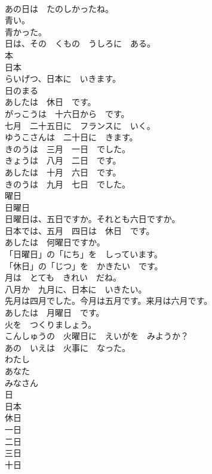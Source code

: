 \documentclass[8pt]{extreport}
\begin{document}
\begin{CJK}{UTF8}{min}
\\	あの日は　たのしかったね。	
\\	青い。	
\\	青かった。	
\\	日は、その　くもの　うしろに　ある。	
\\	本	
\\	日本	
\\	らいげつ、日本に　いきます。	
\\	日のまる	
\\	あしたは　休日　です。	
\\	がっこうは　十六日から　です。	
\\	七月　二十五日に　フランスに　いく。	
\\	ゆうこさんは　二十日に　きます。	
\\	きのうは　三月　一日　でした。	
\\	きょうは　八月　二日　です。	
\\	あしたは　十月　六日　です。	
\\	きのうは　九月　七日　でした。	
\\	曜日	
\\	日曜日	
\\	日曜日は、五日ですか。それとも六日ですか。	
\\	日本では、五月　四日は　休日　です。	
\\	あしたは　何曜日ですか。	
\\	「日曜日」の「にち」を　しっています。	
\\	「休日」の「じつ」を　かきたい　です。	
\\	月は　とても　きれい　だね。	
\\	八月か　九月に、日本に　いきたい。	
\\	先月は四月でした。今月は五月です。来月は六月です。	
\\	あしたは　月曜日　です。	
\\	火を　つくりましょう。	
\\	こんしゅうの　火曜日に　えいがを　みようか？	
\\	あの　いえは　火事に　なった。	
\\	わたし	
\\	あなた	
\\	みなさん	
\\	日	
\\	日本	
\\	休日	
\\	一日	
\\	二日	
\\	三日	
\\	十日	

\end{CJK}
\end{document}
